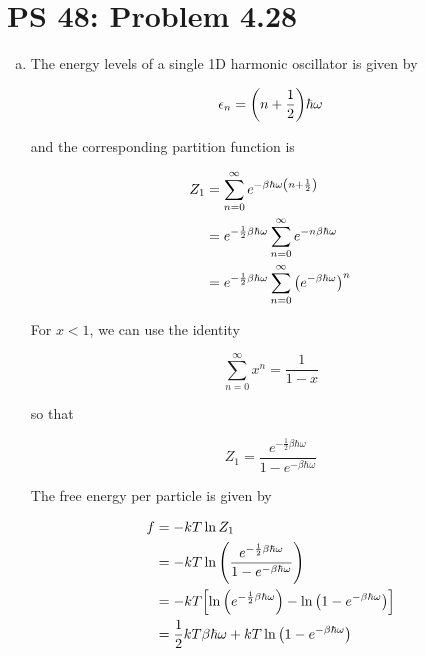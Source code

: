 \documentclass[11pt,a4paper,twocolumn]{article}
\begin{document}
\setcounter{page}{1}

\section*{PS 48: Problem 4.28}
\bigskip

\begin{enumerate}[(a)]

\item The energy levels of a single 1D harmonic oscillator is given by

\begin{equation}
	\epsilon_n = \qty(n + \frac{1}{2})\hbar\omega \label{eq:energy-levels}
\end{equation}

and the corresponding partition function is

\begin{align*}
	Z_1 &= \sum_{n=0}^\infty e^{-\beta\hbar\omega\qty(n+\frac{1}{2})} \\
	&= e^{-\frac{1}{2}\beta\hbar\omega} \sum_{n=0}^\infty e^{-n\beta\hbar\omega} \\
	&= e^{-\frac{1}{2}\beta\hbar\omega} \sum_{n=0}^\infty \qty(e^{-\beta\hbar\omega})^n
\end{align*}

For $x < 1$, we can use the identity

\begin{equation} \label{eq:geometric-identity}
	\sum_{n=0}^\infty x^n = \frac{1}{1-x}
\end{equation}

so that

\begin{equation}
	Z_1 = \frac{e^{-\frac{1}{2}\beta\hbar\omega}}{1 - e^{-\beta\hbar\omega}} \label{eq:partition}
\end{equation}

The free energy per particle is given by

\begin{align}
	f &= -kT \ln{Z_1} \label{eq:free-energy} \\
	&= -kT \ln\qty(\frac{e^{-\frac{1}{2}\beta\hbar\omega}}{1 - e^{-\beta\hbar\omega}}) \nonumber \\
	&= -kT \qty[\ln\qty(e^{-\frac{1}{2}\beta\hbar\omega}) - \ln\qty(1 - e^{-\beta\hbar\omega})] \nonumber \\
	&= \frac{1}{2}kT\beta\hbar\omega + kT\ln\qty(1 - e^{-\beta\hbar\omega})
\end{align}


\end{enumerate}
\end{document}
